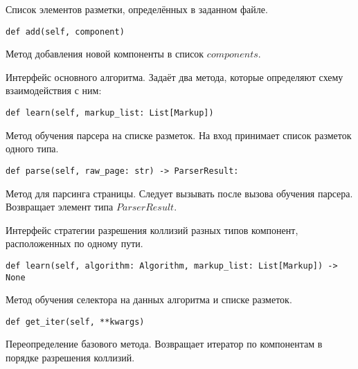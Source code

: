 Список элементов разметки, определённых в заданном файле.
\\

\begin{lstlisting}
def add(self, component)
\end{lstlisting}

Метод добавления новой компоненты в список $components$.
\\



Интерфейс основного алгоритма. Задаёт два метода, которые определяют схему взаимодействия с ним:
\\

\begin{lstlisting}
def learn(self, markup_list: List[Markup])
\end{lstlisting}

Метод обучения парсера на списке разметок. На вход принимает список разметок одного типа.
\\

\begin{lstlisting}
def parse(self, raw_page: str) -> ParserResult:
\end{lstlisting}

Метод для парсинга страницы. Следует вызывать после вызова обучения парсера. Возвращает элемент типа $ParserResult$.



Интерфейс стратегии разрешения коллизий разных типов компонент, расположенных по одному пути.
\\

\begin{lstlisting}
def learn(self, algorithm: Algorithm, markup_list: List[Markup]) -> None
\end{lstlisting}

Метод обучения селектора на данных алгоритма и списке разметок.
\\

\begin{lstlisting}
def get_iter(self, **kwargs)
\end{lstlisting}

Переопределение базового метода. Возвращает итератор по компонентам в порядке разрешения коллизий.
\\

